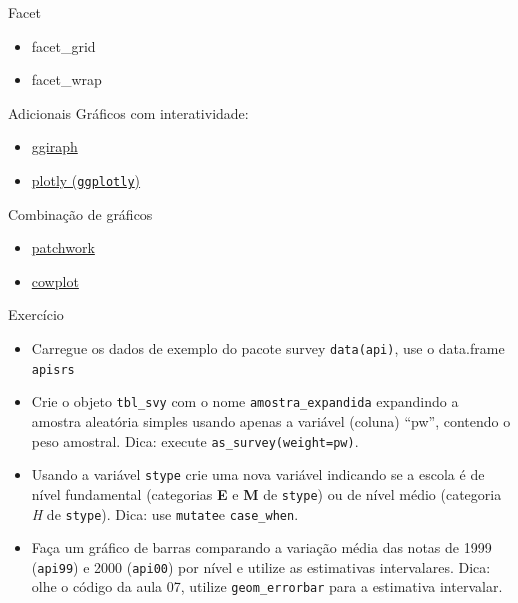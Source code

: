 \documentclass[
  9pt,
  ignorenonframetext,
]{beamer}
\begin{document}
\begin{frame}{Facet}
\protect\hypertarget{facet}{}
\begin{itemize}
\item
  facet\_grid
\item
  facet\_wrap
\end{itemize}
\end{frame}

\begin{frame}[fragile]{Adicionais}
\protect\hypertarget{adicionais}{}
Gráficos com interatividade:

\begin{itemize}
\item
  \href{https://davidgohel.github.io/ggiraph/articles/offcran/using_ggiraph.html}{ggiraph}
\item
  \href{https://plotly-r.com/index.html}{plotly (\texttt{ggplotly})}
\end{itemize}

Combinação de gráficos

\begin{itemize}
\item
  \href{https://patchwork.data-imaginist.com/articles/patchwork.html}{patchwork}
\item
  \href{https://wilkelab.org/cowplot/articles/introduction.html}{cowplot}
\end{itemize}
\end{frame}

\begin{frame}[fragile]{Exercício}
\protect\hypertarget{exercuxedcio}{}
\begin{itemize}
\item
  Carregue os dados de exemplo do pacote survey \texttt{data(api)}, use
  o data.frame \texttt{apisrs}
\item
  Crie o objeto \texttt{tbl\_svy} com o nome \texttt{amostra\_expandida}
  expandindo a amostra aleatória simples usando apenas a variável
  (coluna) ``pw'', contendo o peso amostral. Dica: execute
  \texttt{as\_survey(weight=pw)}.
\item
  Usando a variável \texttt{stype} crie uma nova variável indicando se a
  escola é de nível fundamental (categorias \textbf{E} e \textbf{M} de
  \texttt{stype}) ou de nível médio (categoria \emph{H} de
  \texttt{stype}). Dica: use \texttt{mutate}e \texttt{case\_when}.
\item
  Faça um gráfico de barras comparando a variação média das notas de
  1999 (\texttt{api99}) e 2000 (\texttt{api00}) por nível e utilize as
  estimativas intervalares. Dica: olhe o código da aula 07, utilize
  \texttt{geom\_errorbar} para a estimativa intervalar.
\end{itemize}
\end{frame}
\end{document}
